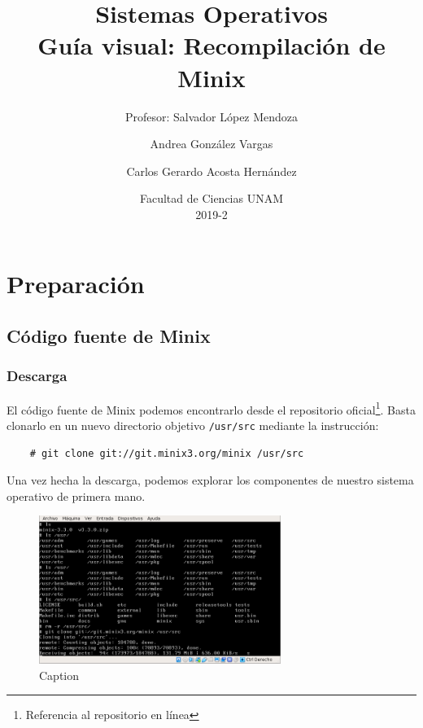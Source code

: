 \documentclass[12pt]{scrartcl}
\title{Sistemas Operativos\\ Guía visual: Recompilación de Minix}
\subtitle{Profesor: Salvador López Mendoza}
\author{Andrea González Vargas \and Carlos Gerardo Acosta Hernández}
\date{Facultad de Ciencias UNAM \\ 2019-2}
\begin{document}
\maketitle


\tableofcontents
\newpage
\section{Preparación}\label{prol}

\subsection{Código fuente de Minix}

\subsubsection{Descarga}

El código fuente de Minix podemos encontrarlo desde el repositorio oficial\footnote{Referencia al repositorio en línea}. Basta clonarlo en un nuevo directorio objetivo \texttt{/usr/src} mediante la instrucción:
\begin{verbatim} 
    # git clone git://git.minix3.org/minix /usr/src
\end{verbatim}
Una vez hecha la descarga, podemos explorar los componentes de nuestro sistema operativo de primera mano. 
\begin{figure}[H]
  \centering
  \includegraphics[width=0.7\textwidth]{0.png}
  \caption{Caption}
\end{figure}
\end{document}
